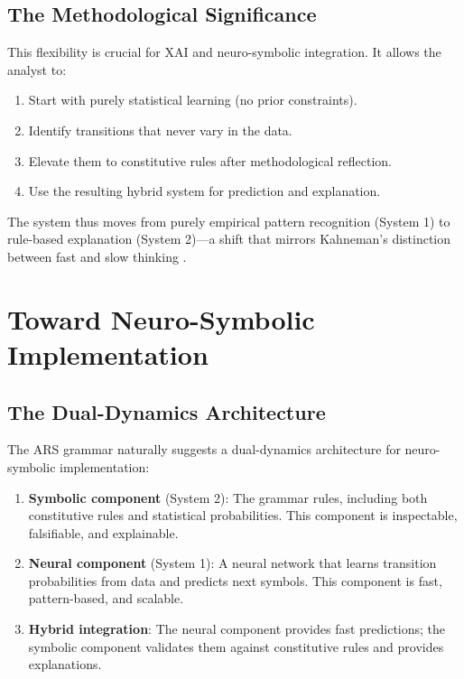 \documentclass[12pt,a4paper]{article}
\begin{document}
\subsection{The Methodological Significance}

This flexibility is crucial for XAI and neuro-symbolic integration. It allows
the analyst to:

\begin{enumerate}
    \item Start with purely statistical learning (no prior constraints).
    \item Identify transitions that never vary in the data.
    \item Elevate them to constitutive rules after methodological reflection.
    \item Use the resulting hybrid system for prediction and explanation.
\end{enumerate}

The system thus moves from purely empirical pattern recognition (System 1)
to rule-based explanation (System 2)—a shift that mirrors Kahneman's
distinction between fast and slow thinking \citep{kahneman2011thinking}.

\section{Toward Neuro-Symbolic Implementation}

\subsection{The Dual-Dynamics Architecture}

The ARS grammar naturally suggests a dual-dynamics architecture for
neuro-symbolic implementation:

\begin{enumerate}
    \item \textbf{Symbolic component} (System 2): The grammar rules, including
    both constitutive rules and statistical probabilities. This component is
    inspectable, falsifiable, and explainable.
    
    \item \textbf{Neural component} (System 1): A neural network that learns
    transition probabilities from data and predicts next symbols. This component
    is fast, pattern-based, and scalable.
    
    \item \textbf{Hybrid integration}: The neural component provides fast
    predictions; the symbolic component validates them against constitutive
    rules and provides explanations.
\end{enumerate}
\end{document}
